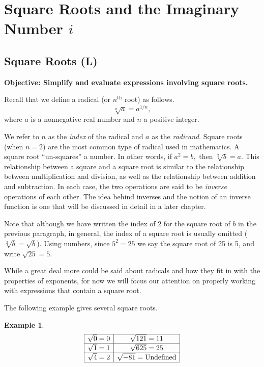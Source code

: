 \documentclass[12pt]{book}
\theoremstyle{definition}
\newtheorem{example}{Example}
\newcommand{\tmop}[1]{\ensuremath{\operatorname{#1}}}
\begin{document}
\section{Square Roots and the Imaginary Number $i$}
\subsection{Square Roots (L)}
{\bf Objective: Simplify and evaluate expressions involving square roots.}\par
Recall that we define a radical (or $n^{\text{th}}$ root) as follows.
$$\sqrt[n]{a}=a^{1/n},$$
where $a$ is a nonnegative real number and $n$ a positive integer.\par
We refer to $n$ as the {\it index} of the radical and $a$ as the {\it radicand}.  Square roots (when $n=2$) are the most common type of radical used in mathematics. A square root ``un-squares'' a number. In other words, if $a^2=b,$ then $\sqrt[2]{b}=a$.  This relationship between a square and a square root is similar to the relationship between multiplication and division, as well as the relationship between addition and subtraction.  In each case, the two operations are said to be {\it inverse} operations of each other.  The idea behind inverses and the notion of an inverse function is one that will be discussed in detail in a later chapter.\par
Note that although we have written the index of 2 for the square root of $b$ in the previous paragraph, in general, the index of a square root is usually omitted ($\sqrt[2]{b}=\sqrt{b}$).  Using numbers, since $5^2 = 25$ we say the square root of 25 is 5, and write $\sqrt{25}=5$.\par
While a great deal more could be said about radicals and how they fit in with the properties of exponents, for now we will focus our attention on properly working with expressions that contain a square root.\par
The following example gives several square roots.
\begin{example}
  \[ \begin{array}{|c|c|}
       \hline
       \sqrt{0} = 0 & \sqrt{121} = 11\\
       \hline
       \sqrt{1} = 1 & \sqrt{625} = 25\\
       \hline
       \sqrt{4} = 2 & \sqrt{- 81} = \tmop{Undefined}\\
       \hline
     \end{array} \]
\end{example}
\end{document}
